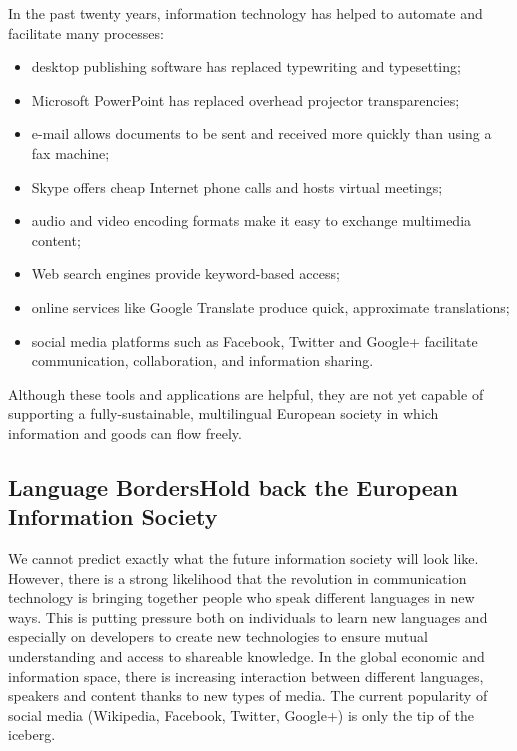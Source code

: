 {\begin{multicols}{2}
In the past twenty years, information technology has helped to automate and facilitate many processes:

\begin{itemize}
\item desktop publishing software has replaced typewriting and typesetting;
\item Microsoft PowerPoint has replaced overhead projector transparencies;
\item e-mail allows documents to be sent and received more quickly than using a fax machine;
\item Skype offers cheap Internet phone calls and hosts virtual meetings;
\item audio and video encoding formats make it easy to exchange multimedia content;
\item Web search engines provide keyword-based access;
\item online services like Google Translate produce quick, approximate translations;
\item social media platforms such as Facebook, Twitter and Google+ facilitate communication, collaboration, and information sharing.
\end{itemize}

Although these tools and applications are helpful, they are not yet capable of supporting a fully-sustainable, multilingual European society in which information and goods can flow freely.

\subsection[Language Borders Hold back the European Information Society]{Language Borders\newline Hold back the European Information Society}

We cannot predict exactly what the future information society will look like. However, there is a strong likelihood that the revolution in communication technology is bringing together people who speak different languages in new ways. This is putting pressure both on individuals to learn new languages and especially on developers to create new technologies to ensure mutual understanding and access to shareable knowledge. In the global economic and information space, there is increasing interaction between different languages, speakers and content thanks to new types of media. The current popularity of social media (Wikipedia, Facebook, Twitter, Google+) is only the tip of the iceberg.


\end{multicols}}

